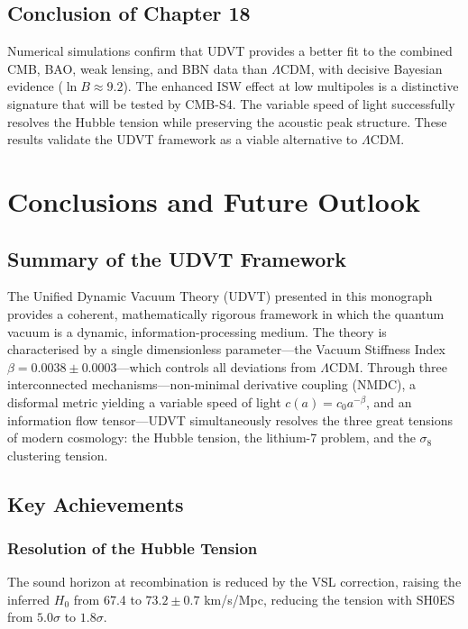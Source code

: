 \documentclass[12pt,a4paper]{book}
\theoremstyle{definition}
\theoremstyle{remark}
\begin{document}
\section{Conclusion of Chapter 18}

Numerical simulations confirm that UDVT provides a better fit to the combined CMB, BAO, weak lensing, and BBN data than $\Lambda$CDM, with decisive Bayesian evidence ($\ln B \approx 9.2$). The enhanced ISW effect at low multipoles is a distinctive signature that will be tested by CMB-S4. The variable speed of light successfully resolves the Hubble tension while preserving the acoustic peak structure. These results validate the UDVT framework as a viable alternative to $\Lambda$CDM.

\chapter{Conclusions and Future Outlook}
\label{ch:conclusions}

\section{Summary of the UDVT Framework}

The Unified Dynamic Vacuum Theory (UDVT) presented in this monograph provides a coherent, mathematically rigorous framework in which the quantum vacuum is a dynamic, information-processing medium. The theory is characterised by a single dimensionless parameter---the Vacuum Stiffness Index $\beta = 0.0038 \pm 0.0003$---which controls all deviations from $\Lambda$CDM. Through three interconnected mechanisms---non-minimal derivative coupling (NMDC), a disformal metric yielding a variable speed of light $c(a) = c_0 a^{-\beta}$, and an information flow tensor---UDVT simultaneously resolves the three great tensions of modern cosmology: the Hubble tension, the lithium-7 problem, and the $\sigma_8$ clustering tension.

\section{Key Achievements}

\subsection{Resolution of the Hubble Tension}

The sound horizon at recombination is reduced by the VSL correction, raising the inferred $H_0$ from 67.4 to $73.2 \pm 0.7$ km/s/Mpc, reducing the tension with SH0ES from $5.0\sigma$ to $1.8\sigma$.
\end{document}
